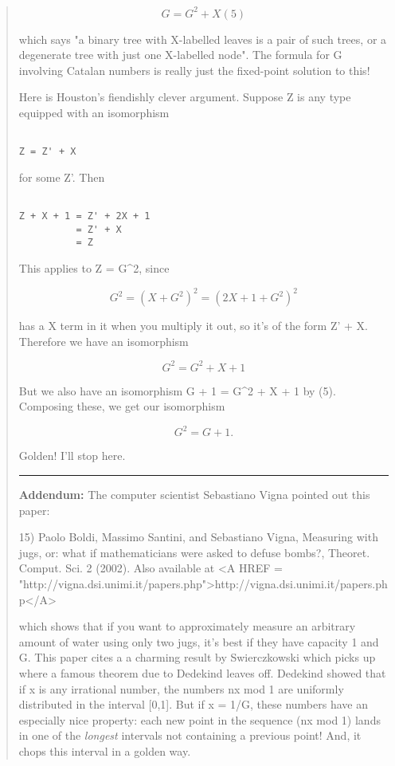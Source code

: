 \begin{quote}
$$

G = G^{2} + X                               (5)
$$
    
which says "a binary tree with X-labelled leaves is a pair of such
trees, or a degenerate tree with just one X-labelled node".  The formula
for G involving Catalan numbers is really just the fixed-point solution 
to this!

Here is Houston's fiendishly clever argument.  Suppose Z is any type 
equipped with an isomorphism 


\begin{verbatim}

Z = Z' + X 
\end{verbatim}
    
for some Z'.  Then 


\begin{verbatim}

Z + X + 1 = Z' + 2X + 1 
          = Z' + X  
          = Z 
\end{verbatim}
    
This applies to Z = G^{2}, since


$$

G^{2} = (X + G^{2})^{2} = (2X + 1 + G^{2})^{2} 
$$
    
has a X term in it when you multiply it out, so it's of the form Z' + X.
Therefore we have an isomorphism


$$

G^{2} = G^{2} + X + 1
$$
    
But we also have an isomorphism G + 1 = G^{2} + X + 1 by (5).  Composing
these, we get our isomorphism


$$

G^{2} = G + 1.
$$
    
Golden!  I'll stop here.

\par\noindent\rule{\textwidth}{0.4pt}
\textbf{Addendum:} The computer
scientist Sebastiano Vigna pointed out this paper:

15) Paolo Boldi, Massimo Santini, and Sebastiano Vigna,
Measuring with jugs, or: what if mathematicians were asked
to defuse bombs?, Theoret. Comput. Sci. 2 (2002).
Also available at <A HREF = "http://vigna.dsi.unimi.it/papers.php">http://vigna.dsi.unimi.it/papers.php</A>

which shows that if you want to approximately measure an 
arbitrary amount of water using only two jugs, it's best if
they have capacity 1 and G.   This paper cites a
a charming result by Swierczkowski which picks up where a
famous theorem due to Dedekind leaves off.  
Dedekind showed that if x is any irrational number, the numbers
nx mod 1 are uniformly distributed in the interval [0,1].  But
if x = 1/G, these numbers have an especially nice property:
each new point in the sequence
(nx mod 1) lands in one of the \emph{longest} intervals
not containing a previous point!  And, it chops this
interval in a golden way.  


\end{quote}
